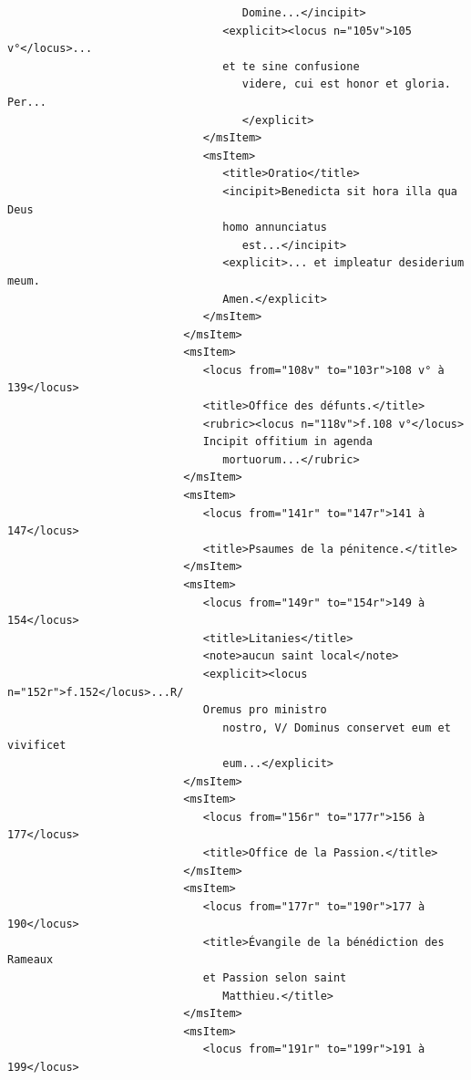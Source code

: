\documentclass[a4paper,12pt,twoside]{book}
\begin{document}
\begin{verbatim}
                                    Domine...</incipit>
                                 <explicit><locus n="105v">105 v°</locus>... 
                                 et te sine confusione
                                    videre, cui est honor et gloria. Per...
                                    </explicit>
                              </msItem>
                              <msItem>
                                 <title>Oratio</title>
                                 <incipit>Benedicta sit hora illa qua Deus 
                                 homo annunciatus
                                    est...</incipit>
                                 <explicit>... et impleatur desiderium meum.
                                 Amen.</explicit>
                              </msItem>
                           </msItem>
                           <msItem>
                              <locus from="108v" to="103r">108 v° à 139</locus>
                              <title>Office des défunts.</title>
                              <rubric><locus n="118v">f.108 v°</locus> 
                              Incipit offitium in agenda
                                 mortuorum...</rubric>
                           </msItem>
                           <msItem>
                              <locus from="141r" to="147r">141 à 147</locus>
                              <title>Psaumes de la pénitence.</title>
                           </msItem>
                           <msItem>
                              <locus from="149r" to="154r">149 à 154</locus>
                              <title>Litanies</title>
                              <note>aucun saint local</note>
                              <explicit><locus n="152r">f.152</locus>...R/
                              Oremus pro ministro
                                 nostro, V/ Dominus conservet eum et vivificet 
                                 eum...</explicit>
                           </msItem>
                           <msItem>
                              <locus from="156r" to="177r">156 à 177</locus>
                              <title>Office de la Passion.</title>
                           </msItem>
                           <msItem>
                              <locus from="177r" to="190r">177 à 190</locus>
                              <title>Évangile de la bénédiction des Rameaux 
                              et Passion selon saint
                                 Matthieu.</title>
                           </msItem>
                           <msItem>
                              <locus from="191r" to="199r">191 à 199</locus>

\end{verbatim}
\end{document}

